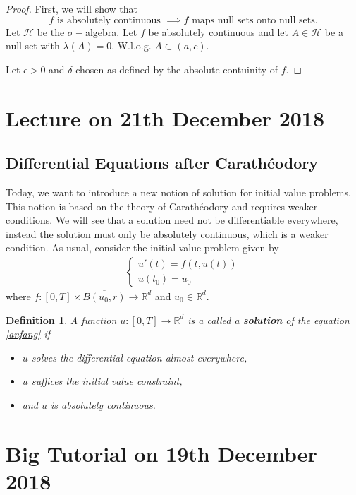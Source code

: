 \documentclass[a4paper, 11pt]{article}
\newtheorem*{definition*}{Definition}
\begin{document}
\begin{proof}
	First, we will show that 
	\[
		f \text{ is absolutely continuous } \implies f \text{ maps null sets onto null sets.}
	\]
	Let $\mathcal H$ be the $\sigma-$algebra. Let $f$ be absolutely continuous and let $A \in \mathcal H$ be a null set with $\lambda(A) = 0$. W.l.o.g. $A \subset (a,c)$.
	
	Let $\epsilon > 0$ and $\delta$ chosen as defined by the absolute contuinity of $f$.
\end{proof}

\section*{Lecture on 21th December 2018}

\subsection*{Differential Equations after Carathéodory}
Today, we want to introduce a new notion of solution for initial value problems. This notion is based on the theory of Carathéodory and requires weaker conditions. We will see that a solution need not be differentiable everywhere, instead the solution must only be absolutely continuous, which is a weaker condition. As usual, consider the initial value problem given by
\begin{align}\label{anfang}
	\begin{cases}
		u'(t) = f(t,u(t)) \\ u(t_0) = u_0
	\end{cases} 
\end{align}
where $f: [0,T] \times \overline{B(u_0, r)} \to \mathbb R^d$ and $u_0 \in \mathbb R^d$. 

\begin{definition*}
	A function $u: [0,T] \to \mathbb R^d$ is a called a \textbf{solution} of the equation \eqref{anfang} if 
	\begin{itemize}
		\item $u$ solves the differential equation almost everywhere,
		\item $u$ suffices the initial value constraint,
		\item and $u$ is absolutely continuous.
	\end{itemize}
\end{definition*}

\section*{Big Tutorial on 19th December 2018}
\end{document}
